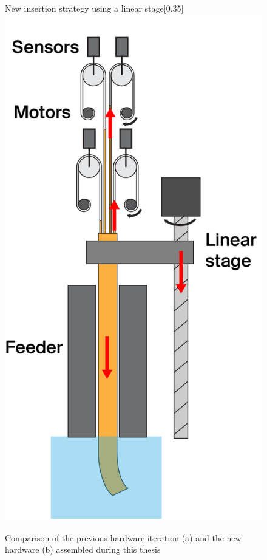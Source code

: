 \begin{figure}[H]
\begin{subcaptionbox}{New insertion strategy using a linear stage\label{fig:right}}[0.35\linewidth]
        {\includegraphics[width=\linewidth]{images/Hardware/insertion.PNG}}
    \end{subcaptionbox}
    \caption{Comparison of the previous hardware iteration (a) and the new hardware (b) assembled during this thesis}
    \label{fig:insertionStrategies}
\end{figure}

